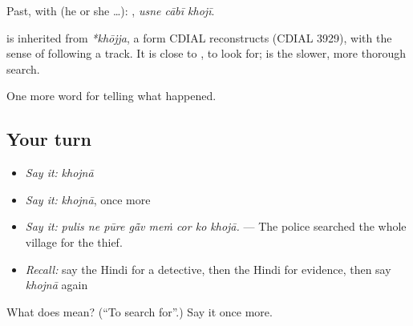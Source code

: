 Past, with  (he or she …):   , \emph{usne cābī khojī}.

\begin{cousinweb}
is inherited from \emph{*khōjja}, a form CDIAL reconstructs (CDIAL 3929), with the sense of following a track. It is close to \textbf{}, to look for; \textbf{} is the slower, more thorough search.
\end{cousinweb}

\begin{grammarlens}[title={What you've built}]
One more word for telling what happened.
\end{grammarlens}

\subsection*{Your turn}
\begin{itemize}
\raggedright
  \item \emph{Say it:} \emph{khojnā}
  \item \emph{Say it:} \emph{khojnā}, once more
  \item \emph{Say it:} \emph{pulis ne pūre gā̃v meṁ cor ko khojā.} — The police searched the whole village for the thief.
  \item \emph{Recall:} say the Hindi for a detective, then the Hindi for evidence, then say \emph{khojnā} again
\end{itemize}

\begin{tcolorbox}[breakable,colback=teal!4,colframe=teal!35!black,title={Before you move on}]
What does  mean? (\textquotedblleft{}To search for\textquotedblright{}.) Say it once more.
\end{tcolorbox}

